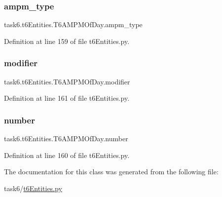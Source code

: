 \subsubsection{\texorpdfstring{ampm\+\_\+type}{ampm\_type}}
{\footnotesize\ttfamily task6.\+t6\+Entities.\+T6\+A\+M\+P\+M\+Of\+Day.\+ampm\+\_\+type}



Definition at line 159 of file t6\+Entities.\+py.

\mbox{\label{classtask6_1_1t6Entities_1_1T6AMPMOfDay_a775ca0b3161fef5d092cd5364bc4a954}} 
\subsubsection{\texorpdfstring{modifier}{modifier}}
{\footnotesize\ttfamily task6.\+t6\+Entities.\+T6\+A\+M\+P\+M\+Of\+Day.\+modifier}



Definition at line 161 of file t6\+Entities.\+py.

\mbox{\label{classtask6_1_1t6Entities_1_1T6AMPMOfDay_a3d94781e4fb82b58d2adc8637bf515ac}} 
\subsubsection{\texorpdfstring{number}{number}}
{\footnotesize\ttfamily task6.\+t6\+Entities.\+T6\+A\+M\+P\+M\+Of\+Day.\+number}



Definition at line 160 of file t6\+Entities.\+py.



The documentation for this class was generated from the following file\+:\begin{DoxyCompactItemize}
\item 
task6/\hyperlink{t6Entities_8py}{t6\+Entities.\+py}\end{DoxyCompactItemize}
